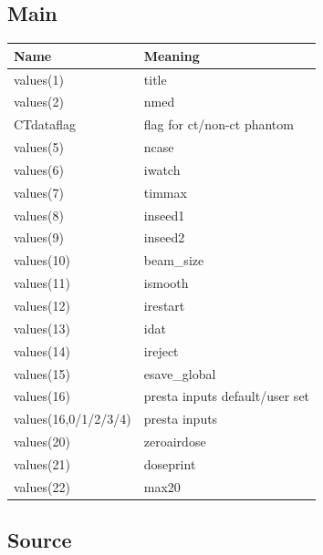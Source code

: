 \documentclass[12pt]{book}
\begin{document}
\subsection{Main}
\begin{tabular} {|p{1.5in}|p{3.75in}|}
\hline
Name & Meaning \\ \hline
values(1) & title \\
values(2) & nmed \\
CTdataflag & flag for ct/non-ct phantom\\
values(5) & ncase \\
values(6) & iwatch \\
values(7) & timmax \\
values(8) & inseed1 \\
values(9) & inseed2 \\
values(10) & beam\_size \\
values(11) & ismooth \\
values(12) & irestart \\
values(13) & idat \\
values(14) & ireject \\
values(15) & esave\_global \\
values(16) & presta inputs default/user set \\
values(16,0/1/2/3/4) & presta inputs \\
values(20) & zeroairdose \\
values(21) & doseprint \\
values(22) & max20 \\ \hline
\end{tabular}

\subsection{Source}
\end{document}
